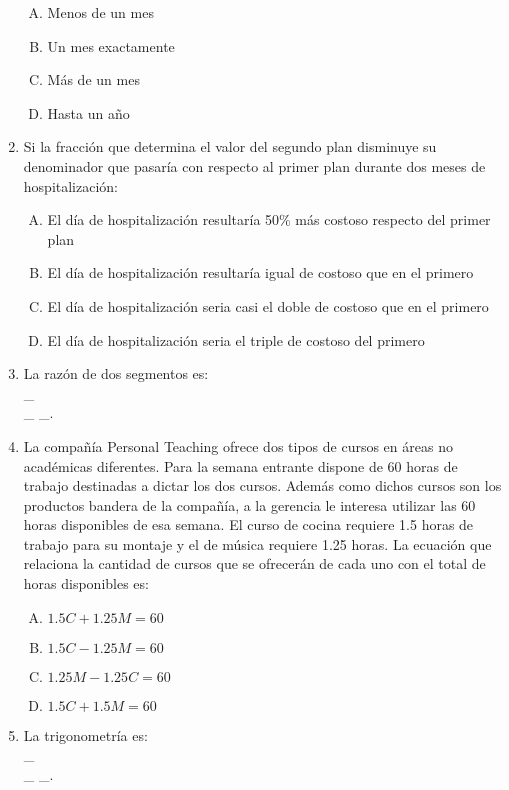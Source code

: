 \begin{enumerate}
\begin{enumerate}[(A)]
\item  Menos de un mes
\item Un mes exactamente
\item Más de un mes
\item Hasta un año
\end{enumerate}


\item Si la fracción que determina el valor del segundo plan disminuye su denominador que pasaría con respecto al primer plan durante dos meses de hospitalización: \label{yolma-22}\\

\begin{enumerate}[(A)]
\item  El día de hospitalización resultaría 50\% más costoso respecto del primer plan
\item El día de hospitalización resultaría igual de costoso que en el primero
\item El día de hospitalización seria casi el doble de costoso que en el primero
\item El día de hospitalización seria el triple de costoso del primero
\end{enumerate}


\item La razón de dos segmentos es: \label{yolma-23}\hrulefill\\
\_\hrulefill\\
\_\hrulefill
\_\hrulefill.



\item La compañía Personal Teaching ofrece dos tipos de cursos en áreas no académicas diferentes. Para la semana entrante dispone de 60 horas de trabajo destinadas a dictar los dos cursos. Además como dichos cursos son los productos bandera de la compañía, a la gerencia le interesa utilizar las 60 horas disponibles de esa semana. El curso de cocina requiere 1.5 horas de trabajo para su montaje y el de música requiere 1.25 horas. La ecuación que relaciona la cantidad de cursos que se ofrecerán de cada uno con el total de horas disponibles es: \label{yolma-24}\\

\begin{enumerate}[(A)]
\item  $1.5C+1.25M=60$
\item $1.5C-1.25M=60$
\item $1.25M-1.25C=60$
\item $1.5C+1.5M=60$
\end{enumerate}


\item La trigonometría es: \label{yolma-25}\hrulefill\\
\_\hrulefill\\
\_\hrulefill
\_\hrulefill.

\end{enumerate}

